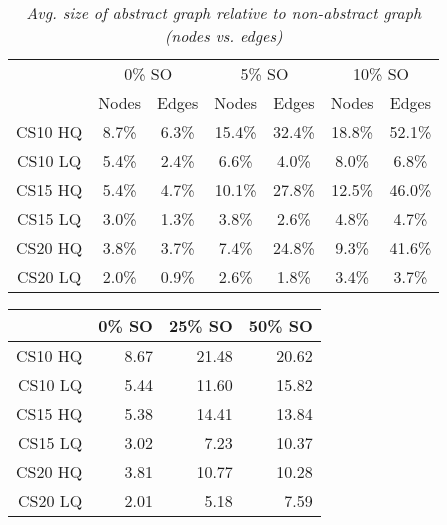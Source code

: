 \begin{table}[ht]
\begin{center}
\caption{\small{\emph{Avg. size of abstract graph relative to non-abstract graph (nodes vs. edges)}}}
\label{aha-table:graphsize}
\begin{tabular*}{0.49\textwidth}{@{\extracolsep{\fill}}ccccccc}%
  \hline
 & \multicolumn{2}{c}{\small{0\% SO}} & \multicolumn{2}{c}{\small{5\% SO}} & \multicolumn{2}{c}{\small{10\% SO}} \\
 & \small{Nodes} & \small{Edges} & \small{Nodes} & \small{Edges} & \small{Nodes} & \small{Edges} \\
  \hline
  \small{CS10 HQ} & \small{8.7\%} & \small{6.3\%} & \small{15.4\%} & \small{32.4\%} & \small{18.8\%} & \small{52.1\%} \\
  \small{CS10 LQ} & \small{5.4\%} & \small{2.4\%} & \small{6.6\%}  & \small{4.0\%}  & \small{8.0\%}  & \small{6.8\%} \\
  \small{CS15 HQ} & \small{5.4\%} & \small{4.7\%} & \small{10.1\%}  & \small{27.8\%} & \small{12.5\%}  & \small{46.0\%} \\
  \small{CS15 LQ} & \small{3.0\%} & \small{1.3\%} & \small{3.8\%}  & \small{2.6\%}  & \small{4.8\%}  & \small{4.7\%} \\
  \small{CS20 HQ} & \small{3.8\%} & \small{3.7\%} & \small{7.4\%}  & \small{24.8\%} & \small{9.3\%}  & \small{41.6\%} \\
  \small{CS20 LQ} & \small{2.0\%} & \small{0.9\%} & \small{2.6\%}  & \small{1.8\%}  & \small{3.4\%}  & \small{3.7\%} \\
   \hline
\end{tabular*}
\end{center}
\end{table}
\begin{table}[ht]
\begin{center}
\begin{tabular}{rrrr}
  \hline
 & 0\% SO & 25\% SO & 50\% SO \\
  \hline
CS10 HQ & 8.67 & 21.48 & 20.62 \\
  CS10 LQ & 5.44 & 11.60 & 15.82 \\
  CS15 HQ & 5.38 & 14.41 & 13.84 \\
  CS15 LQ & 3.02 & 7.23 & 10.37 \\
  CS20 HQ & 3.81 & 10.77 & 10.28 \\
  CS20 LQ & 2.01 & 5.18 & 7.59 \\
   \hline
\end{tabular}
\end{center}
\end{table}


